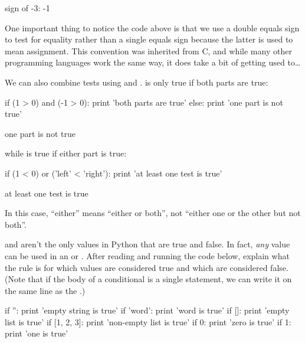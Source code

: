 \begin{VerbOut}
sign of -3: -1
\end{VerbOut}

One important thing to notice the code above is that we use a double
equals sign \code{==} to test for equality rather than a single equals
sign because the latter is used to mean assignment. This convention was
inherited from C, and while many other programming languages work the
same way, it does take a bit of getting used to\ldots{}

We can also combine tests using  and .
 is only true if both parts are true:

\begin{VerbIn}
if (1 > 0) and (-1 > 0):
    print 'both parts are true'
else:
    print 'one part is not true'
\end{VerbIn}

\begin{VerbOut}
one part is not true
\end{VerbOut}

while  is true if either part is true:

\begin{VerbIn}
if (1 < 0) or ('left' < 'right'):
    print 'at least one test is true'
\end{VerbIn}

\begin{VerbOut}
at least one test is true
\end{VerbOut}

In this case, ``either'' means ``either or both'', not ``either one or
the other but not both''.

\begin{challenge}
   and  aren't the only values in Python that
  are true and false. In fact, \emph{any} value can be used in an
   or . After reading and running the code
  below, explain what the rule is for which values are considered true
  and which are considered false. (Note that if the body of a
  conditional is a single statement, we can write it on the same line as
  the .)

\begin{VerbIn}
if '': print 'empty string is true'
if 'word': print 'word is true'
if []: print 'empty list is true'
if [1, 2, 3]: print 'non-empty list is true'
if 0: print 'zero is true'
if 1: print 'one is true'
\end{VerbIn}
\end{challenge}

